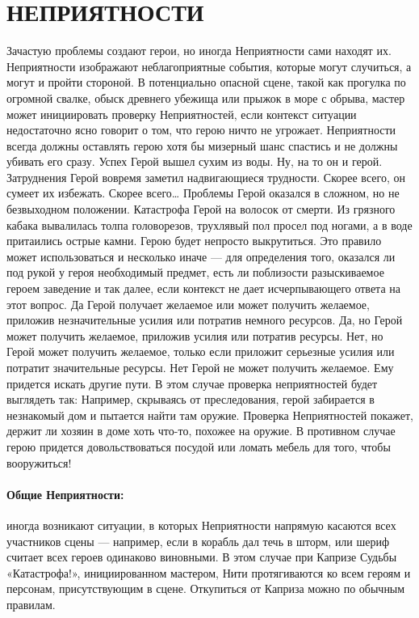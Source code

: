 \section{НЕПРИЯТНОСТИ}

Зачастую проблемы создают герои, но иногда Неприятности сами находят их. Неприятности изображают неблагоприятные события, которые могут случиться, а могут и пройти стороной. В потенциально опасной сцене, такой как прогулка по огромной свалке, обыск древнего убежища или прыжок в море с обрыва, мастер может инициировать проверку Неприятностей, если контекст ситуации недостаточно ясно говорит о том, что герою ничто не угрожает.
\newline
Неприятности всегда должны оставлять герою хотя бы мизерный шанс спастись и не должны убивать его сразу.
\trouble
{Успех}%
{Герой вышел сухим из воды. Ну, на то он и герой.}%
{Затруднения}%
{Герой вовремя заметил надвигающиеся трудности. Скорее всего, он сумеет их избежать. Скорее всего…}%
{Проблемы}%
{Герой оказался в сложном, но не безвыходном положении.}%
{Катастрофа}%
{Герой на волосок от смерти. Из грязного кабака вывалилась толпа головорезов, трухлявый пол просел под ногами, а в воде притаились острые камни. Герою будет непросто выкрутиться.}%
Это правило может использоваться и несколько иначе — для определения того, оказался ли под рукой у героя необходимый предмет, есть ли поблизости разыскиваемое героем заведение и так далее, если контекст не дает исчерпывающего ответа на этот вопрос.
\trouble
{Да}%
{Герой получает желаемое или может получить желаемое, приложив незначительные усилия или потратив немного ресурсов.}%
{Да, но}%
{Герой может получить желаемое, приложив усилия или потратив ресурсы.}%
{Нет, но}%
{Герой может получить желаемое, только если приложит серьезные усилия или потратит значительные ресурсы.}%
{Нет}%
{Герой не может получить желаемое. Ему придется искать другие пути.}%
В этом случае проверка неприятностей будет выглядеть так: Например, скрываясь от преследования, герой забирается в незнакомый дом и пытается найти там оружие. Проверка Неприятностей покажет, держит ли хозяин в доме хоть что-то, похожее на оружие. В противном случае герою придется довольствоваться посудой или ломать мебель для того, чтобы вооружиться!
\paragraph{Общие Неприятности:} иногда возникают ситуации, в которых Неприятности напрямую касаются всех участников сцены — например, если в корабль дал течь в шторм, или шериф считает всех героев одинаково виновными. В этом случае при Капризе Судьбы «Катастрофа!», инициированном мастером, Нити протягиваются ко всем героям и персонам, присутствующим в сцене. Откупиться от Каприза можно по обычным правилам.
